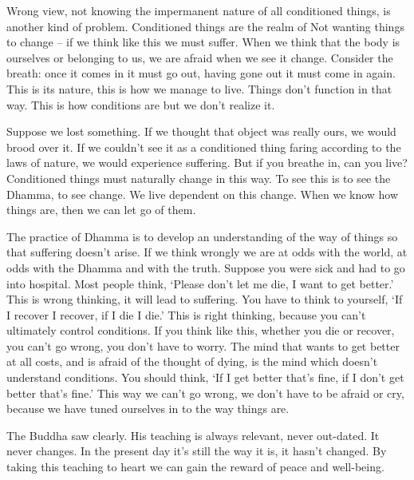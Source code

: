 Wrong view, not knowing the impermanent nature of all conditioned things, is another kind of problem. Conditioned things are the realm of  Not wanting things to change -- if we think like this we must suffer. When we think that the body is ourselves or belonging to us, we are afraid when we see it change. Consider the breath: once it comes in it must go out, having gone out it must come in again. This is its nature, this is how we manage to live. Things don't function in that way. This is how conditions are but we don't realize it.

Suppose we lost something. If we thought that object was really ours, we would brood over it. If we couldn't see it as a conditioned thing faring according to the laws of nature, we would experience suffering. But if you breathe in, can you live? Conditioned things must naturally change in this way. To see this is to see the Dhamma, to see  change. We live dependent on this change. When we know how things are, then we can let go of them.

The practice of Dhamma is to develop an understanding of the way of things so that suffering doesn't arise. If we think wrongly we are at odds with the world, at odds with the Dhamma and with the truth. Suppose you were sick and had to go into hospital. Most people think, `Please don't let me die, I want to get better.' This is wrong thinking, it will lead to suffering. You have to think to yourself, `If I recover I recover, if I die I die.' This is right thinking, because you can't ultimately control conditions. If you think like this, whether you die or recover, you can't go wrong, you don't have to worry. The mind that wants to get better at all costs, and is afraid of the thought of dying, is the mind which doesn't understand conditions. You should think, `If I get better that's fine, if I don't get better that's fine.' This way we can't go wrong, we don't have to be afraid or cry, because we have tuned ourselves in to the way things are.

The Buddha saw clearly. His teaching is always relevant, never out-dated. It never changes. In the present day it's still the way it is, it hasn't changed. By taking this teaching to heart we can gain the reward of peace and well-being.

